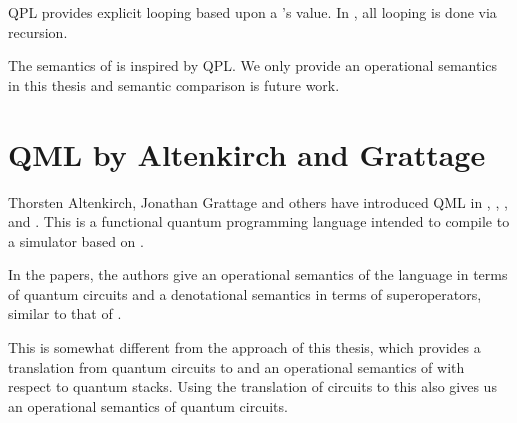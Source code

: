QPL provides explicit looping based upon a \bit{}'s value. In \lqpl, all
looping is done via recursion.

The semantics of \lqpl{} is inspired by QPL. We only provide an operational
semantics in this thesis and semantic comparison is future work.

\section{QML by Altenkirch and Grattage}\label{sec:QML}
Thorsten Altenkirch, Jonathan Grattage and others have introduced QML in 
\cite{alti05:qmlc-draft},
\cite{alti05:jqpl-draft},
\cite{alti05:functionalQMLlics}, and  \cite{alti05:algebraqpl05}. 
This is a functional quantum programming language intended to compile
to a simulator based on  \cite{sabry03:qcinH}.

In the papers, the authors give an operational semantics of the language
in terms of quantum circuits and a denotational semantics in terms
of superoperators, similar to that of  \cite{selinger04:qpl}. 

This is somewhat different from the approach of this thesis, which 
provides a translation from quantum circuits to \lqpl{} and an 
operational semantics of \lqpl{} with respect to quantum stacks. 
Using the translation of circuits to \lqpl{} this also gives us an
operational semantics of quantum circuits. 